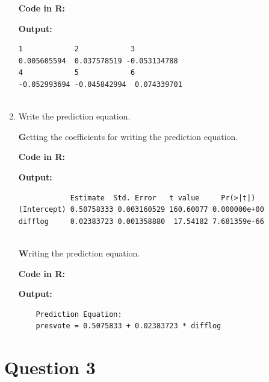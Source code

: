 \documentclass[12pt,letterpaper]{article}
\begin{document}
\begin{enumerate}
		\noindent \textbf{Code in R:}
		  
		\vspace{.25cm}
		
		\noindent \textbf{Output: }
		\begin{verbatim}
1            2            3            
0.005605594  0.037578519 -0.053134788 
4            5            6 
-0.052993694 -0.045842994  0.074339701
			
		\end{verbatim}  
		\vspace{.25cm}
		
		
		\item Write the prediction equation.
		
			\noindent \textbf Getting the coefficients for writing the prediction equation. 
		\vspace{0.5cm}
		
		\noindent \textbf{Code in R:}
		  
		\vspace{.25cm}
		
		\noindent \textbf{Output: }
		\begin{verbatim}
            Estimate  Std. Error   t value     Pr(>|t|)
(Intercept) 0.50758333 0.003160529 160.60077 0.000000e+00
difflog     0.02383723 0.001358880  17.54182 7.681359e-66
			
		\end{verbatim}  
		\vspace{.25cm}
		
		\noindent \textbf Writing the prediction equation. 
				
		\noindent \textbf{Code in R:}
  
\vspace{.25cm}

\noindent \textbf{Output: }
\begin{verbatim}
	Prediction Equation: 
	presvote = 0.5075833 + 0.02383723 * difflog
\end{verbatim}  
		\vspace{1 cm}
		
	\end{enumerate}
	
	\newpage	
\section*{Question 3}
\end{document}
